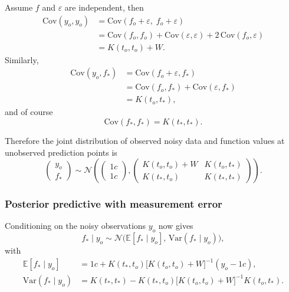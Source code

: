 \documentclass[11pt, titlepage]{article} %
\numberwithin{equation}{section}
\theoremstyle{definition}
\numberwithin{assumption}{section}
\begin{document}
Assume $f$ and $\varepsilon$ are independent, then
\begin{align*}
    \mathrm{Cov}(y_o,y_o)
    &=
    \mathrm{Cov}(f_o+\varepsilon,\;f_o+\varepsilon)\\
    &=
    \mathrm{Cov}(f_o,f_o)+\mathrm{Cov}(\varepsilon,\varepsilon)
    +2\,\mathrm{Cov}(f_o,\varepsilon)\\
    &=
    K(t_o,t_o)+W.
\end{align*}
Similarly,
\begin{align*}
    \mathrm{Cov}(y_o,f_*)
    &=
    \mathrm{Cov}(f_o+\varepsilon,f_*)\\
    &=
    \mathrm{Cov}(f_o,f_*)+\mathrm{Cov}(\varepsilon,f_*)\\
    &=
    K(t_o,t_*),
\end{align*}
and of course
\begin{equation*}
    \mathrm{Cov}(f_*,f_*)=K(t_*,t_*).
\end{equation*}

Therefore the joint distribution of observed noisy data and function values at unobserved prediction points is
\begin{equation*}
    \begin{pmatrix}
        y_o\\
        f_*
    \end{pmatrix}
    \sim
    \mathcal{N}\!\left(
    \begin{pmatrix}
        1c\\
        1c
    \end{pmatrix},
    \begin{pmatrix}
        K(t_o,t_o)+W & K(t_o,t_*)\\
        K(t_*,t_o) & K(t_*,t_*)
    \end{pmatrix}
    \right).
\end{equation*}

\subsubsection*{Posterior predictive with measurement error}

Conditioning on the noisy observations $y_o$ now gives
\begin{equation*}
    f_*\mid y_o \sim \mathcal{N}\!\bigl(\mathbb{E}[f_*\mid y_o],\,\mathrm{Var}(f_*\mid y_o)\bigr),
\end{equation*}
with
\begin{align*}
    \mathbb{E}[f_*\mid y_o]
    &=
    1c+K(t_*,t_o)\bigl[K(t_o,t_o)+W\bigr]^{-1}(y_o-1c),\\
    \mathrm{Var}(f_*\mid y_o)
    &=
    K(t_*,t_*)-K(t_*,t_o)\bigl[K(t_o,t_o)+W\bigr]^{-1}K(t_o,t_*).
\end{align*}
\end{document}
